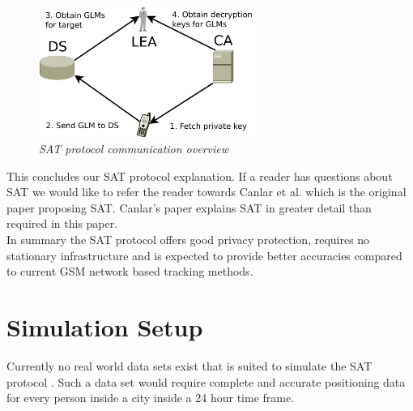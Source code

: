 \documentclass[10pt,titlepage]{article}
\begin{document}
\begin{figure}[h]
\centerline{\includegraphics[width=7cm]{diagram/SAT-communication-2.pdf}}
\caption{\textit{SAT protocol communication overview}}
\label{fig:sat-comm}
\end{figure}












This concludes our SAT protocol explanation. If a reader has questions about SAT we would like to refer the reader towards Canlar et al. \cite{SAT} which is the original paper proposing SAT. Canlar's paper explains SAT in greater detail than required in this paper.\\

In summary the SAT protocol offers good privacy protection, requires no stationary infrastructure and is expected to provide better accuracies compared to current GSM network based tracking methods.





\section{Simulation Setup}
Currently no real world data sets exist that is suited to simulate the SAT protocol \cite{MALNET}. 
Such a data set would require complete and accurate positioning data for every person inside a city inside a 24 hour time frame.\\
\end{document}
